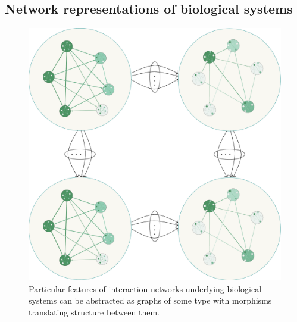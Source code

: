 \documentclass[aps,twocolumn]{revtex4-1}
\begin{document}
\subsection{Network representations of biological systems}

\begin{figure}
\noindent\includegraphics[width=1.3\columnwidth]{fig/biograph.pdf}
\caption{Particular features of interaction networks underlying biological systems can be abstracted as graphs of some type with morphisms translating structure between them.}
\label{fig:biograph}
\end{figure}
\end{document}
